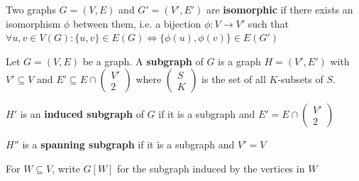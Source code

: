 \vspace{0.5cm}

\begin{definition}
    Two graphs $G=(V,E)$ and $G'=(V',E')$ are \textbf{isomorphic} if there exists an isomorphism $\phi$ between them, i.e. a bijection $\phi:V\to V'$ such that $\forall u,v\in V(G):\{u,v\}\in E(G)\iff \{\phi(u),\phi(v)\}\in E(G')$
\end{definition}

\vspace{0.5cm}

\begin{definition}
    Let $G=(V,E)$ be a graph. A \textbf{subgraph} of $G$ is a graph $H=(V',E')$ with $V'\subseteq V$ and $E'\subseteq E\cap \begin{pmatrix} V' \\ 2 \end{pmatrix}$ where $\begin{pmatrix}
        S \\ K
    \end{pmatrix}$ is the set of all $K$-subsets of $S$.\par
    $H'$ is an \textbf{induced subgraph} of $G$ if it is a subgraph and $E'=E\cap \begin{pmatrix}
        V' \\ 2
    \end{pmatrix}$\par
    $H''$ is a \textbf{spanning subgraph} if it is a subgraph and $V'=V$\par
    For $W\subseteq V$, write $G[W]$ for the subgraph induced by the vertices in $W$
\end{definition}
